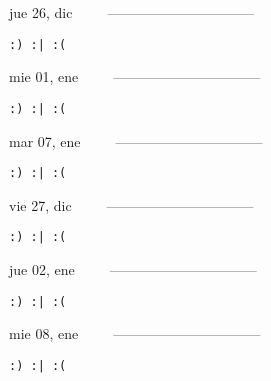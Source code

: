 \documentclass[letterpaper,10pt]{article}
\begin{document}
\begin{multicols}{3}
{jue 26, dic\ \ \ \ \ --------------------------------}
\begin{flushright}\begin{small}\texttt{:) :| :(}\end{small}\end{flushright}
\vfill
{mie 01, ene\ \ \ \ \ --------------------------------}
\begin{flushright}\begin{small}\texttt{:) :| :(}\end{small}\end{flushright}\par
\vfill
{mar 07, ene\ \ \ \ \ --------------------------------}
\begin{flushright}\begin{small}\texttt{:) :| :(}\end{small}\end{flushright}\par
\vfill
\end{multicols}
\vspace{1.05cm}

\begin{multicols}{3}
{vie 27, dic\ \ \ \ \ --------------------------------}
\begin{flushright}\begin{small}\texttt{:) :| :(}\end{small}\end{flushright}
\vfill
{jue 02, ene\ \ \ \ \ --------------------------------}
\begin{flushright}\begin{small}\texttt{:) :| :(}\end{small}\end{flushright}\par
\vfill
{mie 08, ene\ \ \ \ \ --------------------------------}
\begin{flushright}\begin{small}\texttt{:) :| :(}\end{small}\end{flushright}\par
\vfill
\end{multicols}
\vspace{1.05cm}
\end{document}
